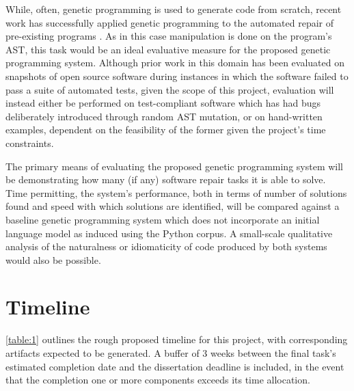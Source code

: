 \documentclass[a4paper,11pt]{proposal}
\begin{document}
While, often, genetic programming is used to generate code from scratch, recent work has successfully applied genetic programming to the automated repair of pre-existing programs \cite{weimer2009}. As in this case manipulation is done on the program's AST, this task would be an ideal evaluative measure for the proposed genetic programming system. Although prior work in this domain has been evaluated on snapshots of open source software during instances in which the software failed to pass a suite of automated tests, given the scope of this project, evaluation will instead either be performed on test-compliant software which has had bugs deliberately introduced through random AST mutation, or on hand-written examples, dependent on the feasibility of the former given the project's time constraints.

The primary means of evaluating the proposed genetic programming system will be demonstrating how many (if any) software repair tasks it is able to solve. Time permitting, the system's performance, both in terms of number of solutions found and speed with which solutions are identified, will be compared against a baseline genetic programming system which does not incorporate an initial language model as induced using the Python corpus. A small-scale qualitative analysis of the naturalness or idiomaticity of code produced by both systems would also be possible.


\section{Timeline}
\autoref{table:1} outlines the rough proposed timeline for this project, with corresponding artifacts expected to be generated. A buffer of 3 weeks between the final task's estimated completion date and the dissertation deadline is included, in the event that the completion one or more components exceeds its time allocation.
\end{document}
